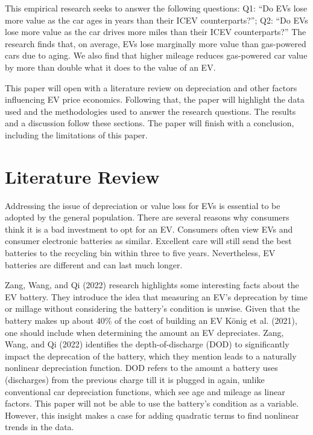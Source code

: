 \documentclass{article}
\begin{document}
This empirical research seeks to answer the following questions: Q1:
``Do EVs lose more value as the car ages in years than their ICEV
counterparts?''; Q2: ``Do EVs lose more value as the car drives more
miles than their ICEV counterparts?'' The research finds that, on
average, EVs lose marginally more value than gas-powered cars due to
aging. We also find that higher mileage reduces gas-powered car value by
more than double what it does to the value of an EV.

This paper will open with a literature review on depreciation and other
factors influencing EV price economics. Following that, the paper will
highlight the data used and the methodologies used to answer the
research questions. The results and a discussion follow these sections.
The paper will finish with a conclusion, including the limitations of
this paper.

\hypertarget{literature-review}{%
\section{Literature Review}\label{literature-review}}

Addressing the issue of depreciation or value loss for EVs is essential
to be adopted by the general population. There are several reasons why
consumers think it is a bad investment to opt for an EV. Consumers often
view EVs and consumer electronic batteries as similar. Excellent care
will still send the best batteries to the recycling bin within three to
five years. Nevertheless, EV batteries are different and can last much
longer.

Zang, Wang, and Qi (2022) research highlights some interesting facts
about the EV battery. They introduce the idea that measuring an EV's
deprecation by time or millage without considering the battery's
condition is unwise. Given that the battery makes up about 40\% of the
cost of building an EV König et al. (2021), one should include when
determining the amount an EV depreciates. Zang, Wang, and Qi (2022)
identifies the depth-of-discharge (DOD) to significantly impact the
deprecation of the battery, which they mention leads to a naturally
nonlinear depreciation function. DOD refers to the amount a battery uses
(discharges) from the previous charge till it is plugged in again,
unlike conventional car depreciation functions, which see age and
mileage as linear factors. This paper will not be able to use the
battery's condition as a variable. However, this insight makes a case
for adding quadratic terms to find nonlinear trends in the data.
\end{document}
